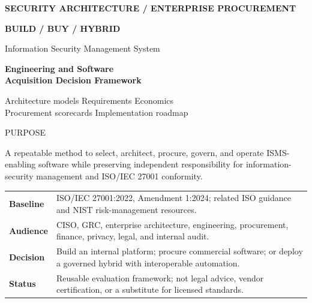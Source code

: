\documentclass[10pt,letterpaper]{article}
\newcommand{\tinylabel}[1]{\textsf{\footnotesize\color{teal}\MakeUppercase{#1}}}
\begin{document}
\thispagestyle{empty}
\vspace*{0.42in}
{\sffamily\color{white}\bfseries\Large SECURITY ARCHITECTURE / ENTERPRISE PROCUREMENT}\par\vspace{0.22in}
{\sffamily\color{white}\fontsize{29}{35}\selectfont\bfseries BUILD \;/\; BUY \;/\; HYBRID}\par\vspace{0.08in}
{\sffamily\color{white}\Large Information Security Management System}\par
\vspace*{1.15in}
{\sffamily\fontsize{23}{28}\selectfont\bfseries Engineering and Software\\Acquisition Decision Framework}\par\vspace{0.25in}
{\Large Architecture models \quad Requirements \quad Economics\\ Procurement scorecards \quad Implementation roadmap}\par\vspace{0.42in}
\begin{tcolorbox}[enhanced,colback=paper,colframe=line,arc=1mm,boxrule=0.6pt]
\tinylabel{Purpose}\par
A repeatable method to select, architect, procure, govern, and operate ISMS-enabling software while preserving independent responsibility for information-security management and ISO/IEC 27001 conformity.\par
\smallskip

\begin{tabularx}{\linewidth}{@{}L{1.17in}Y@{}}
\textbf{Baseline} & ISO/IEC 27001:2022, Amendment 1:2024; related ISO guidance and NIST risk-management resources.\\
\textbf{Audience} & CISO, GRC, enterprise architecture, engineering, procurement, finance, privacy, legal, and internal audit.\\
\textbf{Decision} & Build an internal platform; procure commercial software; or deploy a governed hybrid with interoperable automation.\\
\textbf{Status} & Reusable evaluation framework; not legal advice, vendor certification, or a substitute for licensed standards.\\
\end{tabularx}
\end{tcolorbox}
\end{document}
